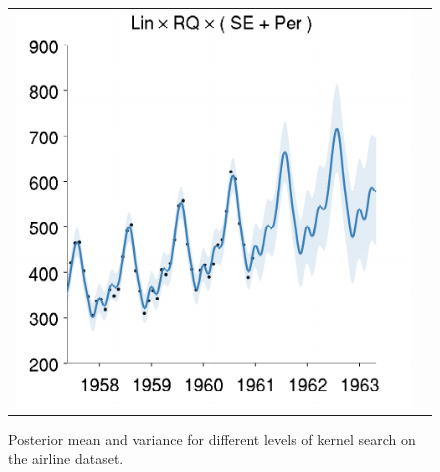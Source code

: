\documentclass[twoside]{article}
\begin{document}
\begin{figure}[h!]
\begin{tabular}{cc}
\hspace{-1cm} \includegraphics[width=\wag,height=\hag]{../figures/decomposition/01-airline-s_max_level_3/01-airline-s_all_small}
\end{tabular}
\caption{Posterior mean and variance for different levels of kernel search on the airline dataset. }
\label{fig:airline_grow}
\end{figure}

\end{document}

